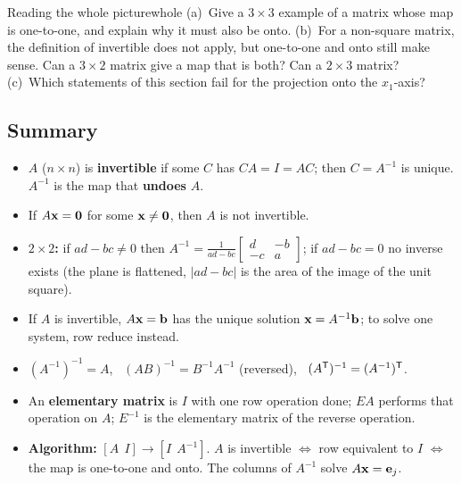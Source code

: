 \documentclass[11pt]{article}
\begin{document}
\begin{think}{Reading the whole picture}{whole}
(a)~Give a $3\times3$ example of a matrix whose map is one-to-one, and explain why it must also be onto. (b)~For a non-square matrix, the definition of invertible does not apply, but one-to-one and onto still make sense. Can a $3\times2$ matrix give a map that is both? Can a $2\times3$ matrix? (c)~Which statements of this section fail for the projection onto the $x_1$-axis?
\end{think}

\subsection*{Summary}
\begin{itemize}
  \item $A$ ($n\times n$) is \textbf{invertible} if some $C$ has $CA=I=AC$; then $C=A^{-1}$ is unique. $A^{-1}$ is the map that \textbf{undoes} $A$.
  \item If $A\mathbf{x}=\mathbf{0}$ for some $\mathbf{x}\neq\mathbf{0}$, then $A$ is not invertible.
  \item \textbf{$2\times2$:} if $ad-bc\neq0$ then $A^{-1}=\frac1{ad-bc}\begin{bmatrix}d&-b\\-c&a\end{bmatrix}$; if $ad-bc=0$ no inverse exists (the plane is flattened, $|ad-bc|$ is the area of the image of the unit square).
  \item If $A$ is invertible, $A\mathbf{x}=\mathbf{b}$ has the unique solution $\mathbf{x}=A^{-1}\mathbf{b}$; to solve one system, row reduce instead.
  \item $(A^{-1})^{-1}=A$, \ $(AB)^{-1}=B^{-1}A^{-1}$ (reversed), \ $(A^{\mathsf T})^{-1}=(A^{-1})^{\mathsf T}$.
  \item An \textbf{elementary matrix} is $I$ with one row operation done; $EA$ performs that operation on $A$; $E^{-1}$ is the elementary matrix of the reverse operation.
  \item \textbf{Algorithm:} $[A\ \ I]\to[I\ \ A^{-1}]$. $A$ is invertible $\iff$ row equivalent to $I$ $\iff$ the map is one-to-one and onto. The columns of $A^{-1}$ solve $A\mathbf{x}=\mathbf{e}_j$.
\end{itemize}
\end{document}
